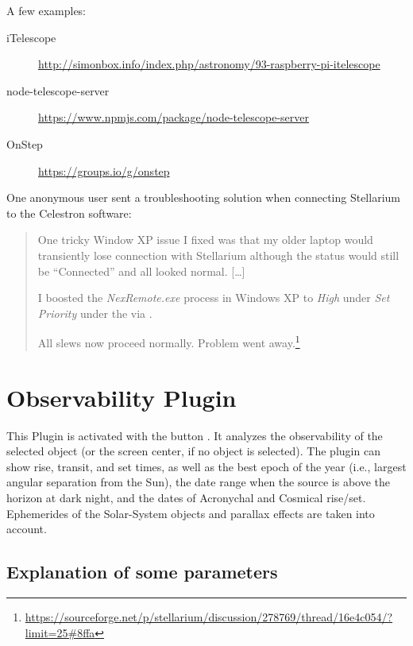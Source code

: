 A few examples:
\begin{description}
\item[iTelescope] \url{http://simonbox.info/index.php/astronomy/93-raspberry-pi-itelescope}
\item[node-telescope-server] \url{https://www.npmjs.com/package/node-telescope-server}
\item[OnStep] \url{https://groups.io/g/onstep}
\end{description}

One anonymous user sent a troubleshooting solution when connecting Stellarium to the Celestron  software:
\begin{quote}

  One tricky Window XP issue I fixed was that my older laptop would
  transiently lose connection with Stellarium although the status
  would still be ``Connected'' and all looked normal. [\ldots]


  I boosted the \emph{NexRemote.exe} process in Windows XP to \emph{High} under
  \emph{Set Priority} under the  via
  .

  All slews now proceed normally. Problem went
  away.\footnote{\url{https://sourceforge.net/p/stellarium/discussion/278769/thread/16e4c054/?limit=25\#8ffa}}
\end{quote}


\newpage
\section{Observability Plugin}
\label{sec:plugins:Observability}

This Plugin is activated with the button . 
It analyzes the observability of the selected object (or the
screen center, if no object is selected). The plugin can show rise,
transit, and set times, as well as the best epoch of the year (i.e.,
largest angular separation from the Sun), the date range when the
source is above the horizon at dark night, and the dates of Acronychal
and Cosmical rise/set.  Ephemerides of the Solar-System objects and
parallax effects are taken into account.

\subsection*{Explanation of some parameters}


